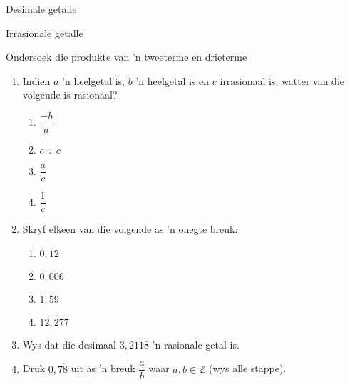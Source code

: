 \begin{Aktiwiteit}{Desimale getalle}
\begin{aktiwiteit}{Irrasionale getalle}
\begin{aktiwiteit}{Ondersoek die produkte van 'n tweeterme en drieterme}
\begin{eocexercises}{}
\begin{enumerate}[itemsep=5pt, label=\textbf{\arabic*}. ] 
\item Indien $a$ ’n heelgetal is, $b$ ’n heelgetal is en $c$ irrasionaal is, watter van die volgende is rasionaal?
    \begin{enumerate}[itemsep=5pt, label=\textbf{\alph*}. ] 
    \item $\dfrac{-b}{a}$
    \item $c \div c$
    \item $\dfrac{a}{c}$
    \item $\dfrac{1}{c}$
    \end{enumerate}
\item Skryf elkeen van die volgende as ’n onegte breuk:
    \begin{enumerate}[itemsep=5pt, label=\textbf{\alph*}. ] 
    \item $0,12$
    \item $0,006$
    \item $1,59$
    \item $12,27\dot{7}$
    \end{enumerate}
\item Wys dat die desimaal $3,21\dot{1}\dot{8}$ ’n rasionale getal is.
\item Druk  $0,7\dot{8}$ uit as ’n breuk $\dfrac{a}{b}$ waar $a,b\in \mathbb{Z}$ (wys alle stappe).






\end{enumerate}
\end{eocexercises}
\end{aktiwiteit}
\end{aktiwiteit}
\end{Aktiwiteit}
